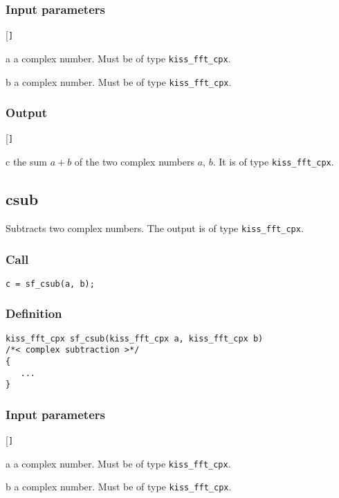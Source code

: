 \subsubsection*{Input parameters}
\begin{desclist}{\tt }{\quad}[\tt ]
   \setlength\itemsep{0pt}
   \item[a] a complex number. Must be of type \texttt{kiss\_fft\_cpx}.
   \item[b] a complex number. Must be of type \texttt{kiss\_fft\_cpx}.
\end{desclist}

\subsubsection*{Output}
\begin{desclist}{\tt }{\quad}[\tt ]
   \setlength\itemsep{0pt}
   \item[c] the sum $a+b$ of the two complex numbers $a$, $b$. It is of type \texttt{kiss\_fft\_cpx}.
\end{desclist}




\subsection{{csub}}
Subtracts two complex numbers. The output is of type \texttt{kiss\_fft\_cpx}.

\subsubsection*{Call}
\begin{verbatim}c = sf_csub(a, b);\end{verbatim}

\subsubsection*{Definition}
\begin{verbatim}
kiss_fft_cpx sf_csub(kiss_fft_cpx a, kiss_fft_cpx b)
/*< complex subtraction >*/
{
   ...
}
\end{verbatim}

\subsubsection*{Input parameters}
\begin{desclist}{\tt }{\quad}[\tt ]
   \setlength\itemsep{0pt}
   \item[a] a complex number. Must be of type \texttt{kiss\_fft\_cpx}.
   \item[b] a complex number. Must be of type \texttt{kiss\_fft\_cpx}.
\end{desclist}

